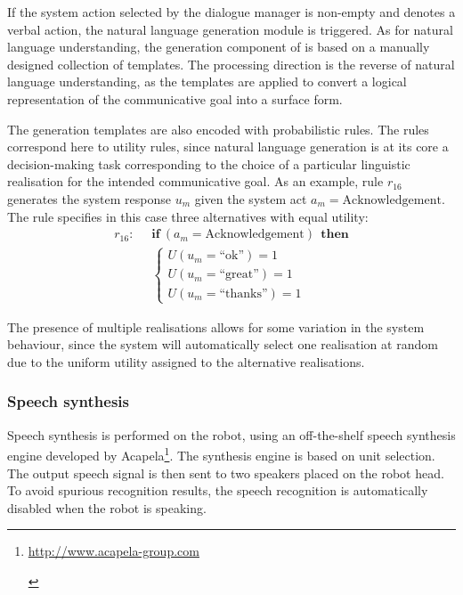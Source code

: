 If the system action selected by the dialogue manager is non-empty and denotes a verbal action, the natural language generation module is triggered.  As for natural language understanding, the generation component of \opendial{} is based on a manually designed collection of templates.  The processing direction is the reverse of natural language understanding, as the templates are applied to convert a logical representation of the communicative goal into a surface form. 

The generation templates are also encoded with probabilistic rules.  The rules correspond here to utility rules, since natural language generation is at its core a decision-making task corresponding to the choice of a particular linguistic realisation for the intended communicative goal.  As an example, rule $r_{16}$ generates the system response $u_m$ given the system act $a_m=\mathrm{Acknowledgement}$.  The rule specifies in this case three alternatives with equal utility:
\begin{align*}
r_{16}: &\;\;\textbf{if} \ (a_m = \mathrm{Acknowledgement} )  \ \ \textbf{then} \\ 
& \;\; \begin{cases} U(u_m=\text{``ok''}) = 1 \\ U(u_m=\text{``great''}) = 1 \\ U(u_m=\text{``thanks''}) = 1 \end{cases}
\end{align*}

The presence of multiple realisations allows for some variation in the system behaviour, since the system will automatically select one realisation at random due to the uniform utility assigned to the alternative realisations.

\subsubsection*{Speech synthesis}

Speech synthesis is performed on the robot, using an off-the-shelf speech synthesis engine developed by Acapela\footnote{\begin{scriptsize}\url{http://www.acapela-group.com}\end{scriptsize}}. The synthesis engine is based on unit selection. The output speech signal is then sent to two speakers placed on the robot head. To avoid spurious recognition results, the speech recognition is automatically disabled when the robot is speaking.  
 

